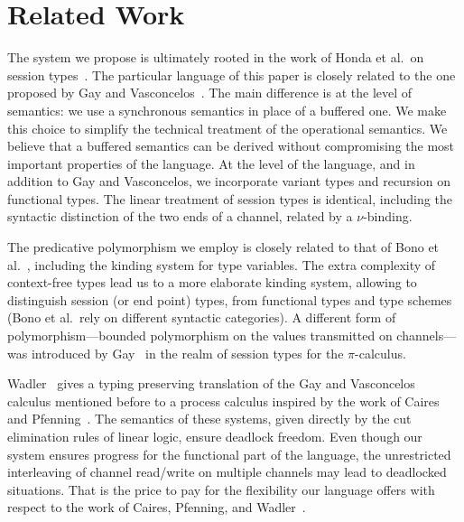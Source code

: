 \section{Related Work}
\label{sec:related-work}

The system we propose is ultimately rooted in the work of Honda et
al.\ on session types~\cite{DBLP:conf/concur/Honda93,DBLP:conf/parle/TakeuchiHK94,DBLP:conf/esop/HondaVK98}.
%
The particular language of this paper is closely related to the one
proposed by Gay and Vasconcelos~\cite{DBLP:journals/jfp/GayV10}. The
main difference is at the level of semantics: we use a synchronous
semantics in place of a buffered one. We make this choice to simplify
the technical treatment of the operational semantics. We believe that
a buffered semantics can be derived without compromising the most
important properties of the language. At the level of the language,
and in addition to Gay and Vasconcelos, we incorporate variant types
and recursion on functional types. The linear treatment of session
types is identical, including the syntactic distinction of the
two ends of a channel, related by a $\nu$-binding.

The predicative polymorphism we employ is closely related to that of
Bono et al.~\cite{BonoPadovaniTosatto13}, including the kinding system
for type variables. The extra complexity of context-free types lead us
to a more elaborate kinding system, allowing to distinguish session (or
end point) types, from functional types and type schemes (Bono et al.\
rely on different syntactic categories).
%
%
A different form of polymorphism---bounded polymorphism on the values
transmitted on channels---was introduced by
Gay~\cite{DBLP:journals/mscs/Gay08} in the realm of session types for
the $\pi$-calculus.

Wadler~\cite{DBLP:journals/jfp/Wadler14} gives a typing preserving
translation of the Gay and Vasconcelos calculus mentioned before to a process
calculus inspired by the work of Caires and
Pfenning~\cite{DBLP:conf/concur/CairesP10}.  The semantics of these
systems, given directly by the cut elimination rules of linear logic,
ensure deadlock freedom. Even though our system ensures progress for
the functional part of the language, the unrestricted interleaving of
channel read/write on multiple channels may lead to deadlocked situations. That is the
price to pay for the flexibility our language offers with respect to
the work of Caires, Pfenning, and Wadler~\cite{DBLP:conf/concur/CairesP10,DBLP:journals/jfp/Wadler14}.

